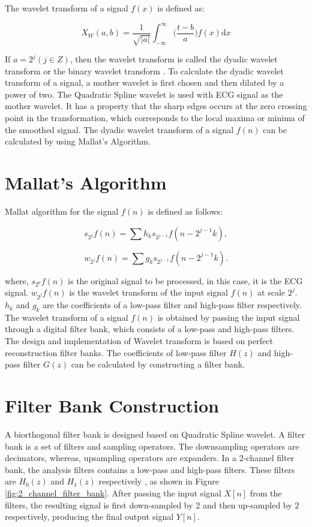 The wavelet transform of a signal $f(x)$ is defined as:

\begin{equation} \label{eqn_wavelet_transform}
{X_{W}(a, b) = \frac{1}{\sqrt{|a|}} \int_{-\infty}^\infty \bigg(\frac{t-b}{a}\bigg)f(x) \mathrm{d}x}
\end{equation}

If $a=2^j (j \in Z)$, then the wavelet transform is called the dyadic wavelet transform or the binary wavelet transform \cite{119727}. 
To calculate the dyadic wavelet transform of a signal, a mother wavelet is first chosen and then dilated by a power of two. The Quadratic Spline wavelet is used with ECG signal as the mother wavelet. It has a property that the sharp edges occurs at the zero crossing point in the transformation, which corresponds to the local maxima or minima of the smoothed signal. The dyadic wavelet transform of a signal $f(n)$ can be calculated by using Mallat's Algorithm. 

\section{Mallat's Algorithm}
Mallat algorithm \cite{119727} for the signal $f(n)$ is defined as follows:

\begin{equation} 
{ s_{2^j}f(n) = \sum h_ks_{2^{j-1}}f(n - 2^{j-1}k),   }
\end{equation}

\begin{equation} 
{ w_{2^j}f(n) = \sum g_ks_{2^{j-1}}f(n - 2^{j-1}k).   }
\end{equation}

where, $s_{2^0}f(n)$ is the original signal to be processed, in this case, it is the ECG signal. $w_{2^j}f(n)$ is the wavelet transform of the input signal $f(n)$ at scale $2^j$. $h_k$ and $g_k$ are the coefficients of a low-pass filter and high-pass filter respectively. The wavelet transform of a signal $f(n)$ is obtained by passing the input signal through a digital filter bank, which consists of a low-pass and high-pass filters. The design and implementation of Wavelet transform is based on perfect reconstruction filter banks. The coefficients of low-pass filter $H(z)$ and high-pass filter $G(z)$ can be calculated by constructing a filter bank.

\section{Filter Bank Construction}
A biorthogonal filter bank is designed based on Quadratic Spline wavelet. A filter bank is a set of filters and sampling operators. The downsampling operators are decimators, whereas, upsampling operators are expanders. In a 2-channel filter bank, the analysis filters contains a low-pass and high-pass filters. These filters are ${H_{0}(z)}$ and ${H_{1}(z)}$ respectively \cite{wang2001using}, as shown in Figure \ref{fig:2_channel_filter_bank}. After passing the input signal $X[n]$ from the filters, the resulting signal is first down-sampled by 2 and then up-sampled by 2 respectively, producing the final output signal $Y[n]$. 

